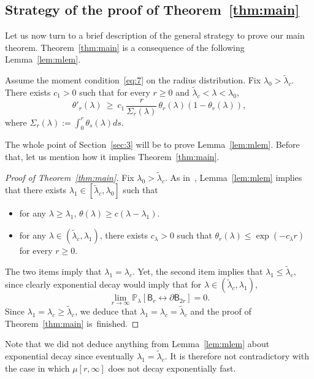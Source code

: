 \documentclass[AHL,Unicode,longabstracts]{cedram}
\begin{document}
\subsection{Strategy of the proof of Theorem~\ref{thm:main}}
Let us now turn to a brief description of the general strategy to prove our main theorem. Theorem~\ref{thm:main} is a consequence of the following Lemma~\ref{lem:mlem}.

\begin{lemm}\label{lem:mlem}
Assume the moment condition~\eqref{eq:7} on the radius distribution. Fix $\lambda_0 > \widetilde\lambda_c$. There exists $c_1>0$ such that for every $r\geq 0$ and $\widetilde\lambda_c < \lambda < \lambda_0$,
\begin{equation}\label{eq:mlem}
{\theta'_r}(\lambda)~\geq~c_1 \, {\frac{r}{{\Sigma_r(\lambda)}}} \, \theta_r(\lambda)(1 - \theta_r(\lambda)),
\end{equation}
where $\Sigma_r(\lambda):= \int_0^r \theta_s(\lambda)ds$.
\end{lemm}

The whole point of Section~\ref{sec:3} will be to prove Lemma~\ref{lem:mlem}. Before that, let us mention how it implies Theorem~\ref{thm:main}.

\begin{proof}[Proof of Theorem~\ref{thm:main}]
Fix $\lambda_0> \widetilde\lambda_c$. As in~\cite[Lemma~3.1]{DumRaoTas16a}, Lemma~\ref{lem:mlem} implies that there exists $\lambda_1\in[\widetilde\lambda_c,\lambda_0]$ such that
\begin{itemize}%
\item for any $\lambda\ge\lambda_1$, $\theta(\lambda)\ge c(\lambda-\lambda_1)$.
\item for any $\lambda\in(\widetilde\lambda_c,\lambda_1)$, there exists $c_\lambda>0$ such that $\theta_r(\lambda)\le \exp(-c_\lambda r)$ for every $r\ge0$.
\end{itemize}
The two items imply that $\lambda_1=\lambda_c$. Yet, the second item implies that $\lambda_1\le \widetilde\lambda_c$, since clearly exponential decay would imply that for $\lambda\in(\widetilde\lambda_c,\lambda_1)$,
\[
\lim_{r\rightarrow\infty}{\mathbb P}_\lambda[\mathsf B_r\stackrel{}{\longleftrightarrow}\partial\mathsf B_{2r}]=0.
\]
Since $\lambda_1 = \lambda_c\ge \widetilde\lambda_c$, we deduce that $\lambda_1=\lambda_c=\widetilde\lambda_c$ and the proof of Theorem~\ref{thm:main} is~finished.
\end{proof}

\begin{rema}
Note that we did not deduce anything from Lemma~\ref{lem:mlem} about exponential decay since eventually $\lambda_1=\widetilde\lambda_c$. It is therefore not contradictory with the case in which $\mu[r,\infty]$ does not decay exponentially fast.
\end{rema}
\end{document}
